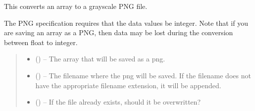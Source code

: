 \documentclass[letterpaper,11pt,english]{sphinxmanual}
\begin{document}

\begin{savenotes}\begin{fulllineitems}
\label{\detokenize{code/opihiexarata.library.image:opihiexarata.library.image.save_array_as_png_grayscale}}
\pysigstartsignatures
{}
\pysigstopsignatures
\sphinxAtStartPar
This converts an array to a grayscale PNG file.

\sphinxAtStartPar
The PNG specification requires that the data values be integer. Note that
if you are saving an array as a PNG, then data may be lost during the
conversion between float to integer.
\begin{quote}\begin{description}
\begin{itemize}
\item {} 
\sphinxAtStartPar
{} () – The array that will be saved as a png.

\item {} 
\sphinxAtStartPar
{} () – The filename where the png will be saved. If the filename does not have
the appropriate filename extension, it will be appended.

\item {} 
\sphinxAtStartPar
{} () – If the file already exists, should it be overwritten?

\end{itemize}

\end{description}\end{quote}

\end{fulllineitems}\end{savenotes}
\end{document}
